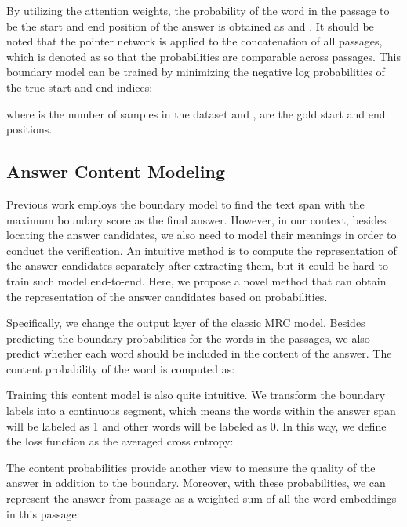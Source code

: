 \documentclass[11pt,a4paper]{article}
\begin{document}
By utilizing the attention weights, the probability of the  word in the passage to be the start and end position of the answer is obtained as  and . It should be noted that the pointer network is applied to the concatenation of all passages, which is denoted as  so that the probabilities are comparable across passages. This boundary model can be trained by minimizing the negative log probabilities of the true start and end indices:

\noindent where  is the number of samples in the dataset and ,  are the gold start and end positions.



\subsection{Answer Content Modeling}
\label{content}





Previous work employs the boundary model to find the text span with the maximum boundary score as the final answer. However, in our context, besides locating the answer candidates, we also need to model their meanings in order to conduct the verification. 
An intuitive method is to compute the representation of the answer candidates separately after extracting them, 
but it could be hard to train such model end-to-end.
Here, we propose a novel method that can obtain the representation of the answer candidates based on probabilities. 


Specifically, we change the output layer of the classic MRC model. Besides predicting the boundary probabilities for the words in the passages, we also predict whether each word should be included in the content of the answer. The content probability of the  word is computed as:



Training this content model is also quite intuitive. We transform the boundary labels into a continuous segment, which means the words within the answer span will be labeled as 1 and other words will be labeled as 0. In this way, we define the loss function as the averaged cross entropy:



The content probabilities provide another view to measure the quality of the answer in addition to the boundary. Moreover, with these probabilities, we can represent the answer from passage  as a weighted sum of all the word embeddings in this passage:
\end{document}
